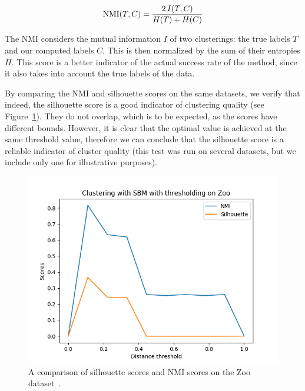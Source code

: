 \documentclass[conference]{IEEEtran}
\begin{document}
\begin{equation}\label{eq:nmi}
\textnormal{NMI}(T, C) = \frac{2 \, I(T, C)}{H(T) + H(C)}
\end{equation}

The NMI considers the mutual information $I$ of two clusterings: the true labels $T$ and our computed labels $C$. This is then normalized by the sum of their entropies $H$.  This score is a better indicator of the actual success rate of the method, since it also takes into account the true labels of the data.

By comparing the NMI and silhouette scores on the same datasets, we verify that indeed, the silhouette score is a good indicator of clustering quality (see Figure~\ref{fig:threshold_sbm_iris_nmi_slh}). They do not overlap, which is to be expected, as the scores have different bounds. However, it is clear that the optimal value is achieved at the same threshold value, therefore we can conclude that the silhouette score is a reliable indicator of cluster quality (this test was run on several datasets, but we include only one for illustrative purposes).

\begin{figure}[ht]
    \centering
    \includegraphics[width=0.9\columnwidth]{results/threshold_clustering_zoo.png}
    \caption{A comparison of silhouette scores and NMI scores on the Zoo dataset~\cite{Lichman:2013}.}
    \label{fig:threshold_sbm_iris_nmi_slh}
\end{figure}


\end{document}

